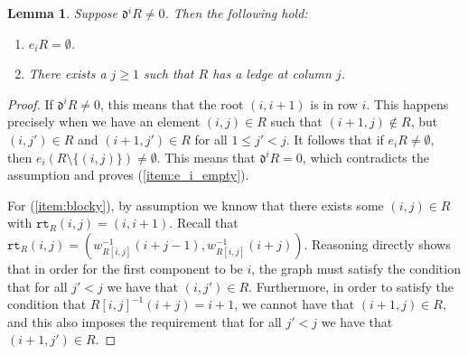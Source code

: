 \documentclass{amsart}
\newtheorem{lemma}{Lemma}[subsection]
\theoremstyle{definition}
\theoremstyle{remark}
\numberwithin{equation}{subsection}
\newcommand{\wof}[1]{w_{#1}}
\newcommand{\rcdd}{\mathfrak{d}}
\newcommand{\rtt}{\mathtt{rt}}
\begin{document}
\begin{lemma} \label{lemma:block_structure}
Suppose $\rcdd^iR\neq 0$. Then the following hold:
\begin{enumerate}
\item \label{item:e_i_empty} $e_iR=\emptyset$.
\item \label{item:blocky} There exists a $j\geq 1$ such that $R$ has a ledge at column $j$.
\end{enumerate}
\end{lemma}
\begin{proof}
If $\rcdd^iR\neq 0$, this means that the root $(i, i+1)$ is in row $i$. This happens precisely when we have an element $(i,j)\in R$ such that $(i+1, j)\notin R$, but $(i, j')\in R$ and $(i+1, j')\in R$ for all $1\leq j'<j$. It follows that if $e_iR\neq \emptyset$, then $e_i(R\setminus\{(i,j)\})\neq \emptyset$. This means that $\rcdd^iR=0$, which contradicts the assumption and proves (\ref{item:e_i_empty}).

For (\ref{item:blocky}), by assumption we knnow that there exists some $(i,j)\in R$ with $\rtt_R(i,j)=(i,i+1)$. Recall that $\rtt_R(i,j) = (\wof{R[i,j]}^{-1}(i + j -1), \wof{R[i,j]}^{-1}(i+j))$. Reasoning directly shows that in order for the first component to be $i$, the graph must satisfy the condition that for all $j' < j$ we have that $(i,j')\in R$. Furthermore, in order to satisfy the condition that $R[i,j]^{-1}(i+j) = i+1$, we cannot have that $(i+1,j)\in R$, and this also imposes the requirement that for all $j' < j$ we have that $(i+1,j')\in R$.
\end{proof}
\end{document}
